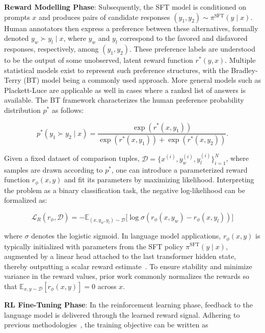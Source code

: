 \textbf{Reward Modelling Phase}: Subsequently, the SFT model is conditioned on prompts $x$ and produces pairs of candidate responses $(y_1, y_2)\sim \pi^\text{SFT}(y \mid x)$. Human annotators then express a preference between these alternatives, formally denoted $y_w\succ y_l \mid x$, where $y_w$ and $y_l$ correspond to the favored and disfavored responses, respectively, among $(y_1, y_2)$. These preference labels are understood to be the output of some unobserved, latent reward function $r^*(y, x)$. Multiple statistical models exist to represent such preference structures, with the Bradley-Terry (BT) \cite{bradley1952rankanalysis} model being a commonly used approach. More general models such as Plackett-Luce \citep{plackett1975analysis, luce2012individual} are applicable as well in cases where a ranked list of answers is available. The BT framework characterizes the human preference probability distribution $p^*$ as follows:

\begin{equation}\label{eq:bradley-terry}
    p^*(y_1\succ y_2 \mid x)=\frac{\exp\left(r^*(x, y_1)\right)}{\exp\left(r^*(x, y_1)\right) + \exp\left(r^*(x, y_2)\right)}.
\end{equation}

Given a fixed dataset of comparison tuples, $\mathcal{D} = \bigl\{x^{(i)}, y_w^{(i)}, y_l^{(i)}\bigr\}_{i=1}^N$, where samples are drawn according to $p^*$, one can introduce a parameterized reward function $r_{\phi}(x, y)$ and fit its parameters by maximizing likelihood. Interpreting the problem as a binary classification task, the negative log-likelihood can be formalized as:

\begin{equation}\label{eq:reward_model}
    \mathcal{L}_R(r_{\phi}, \mathcal{D}) = -\mathbb{E}_{(x, y_w, y_l)\sim \mathcal{D}}\bigl[\log \sigma(r_{\phi}(x, y_w)- r_{\phi}(x, y_l))\bigr]
\end{equation}

where $\sigma$ denotes the logistic sigmoid. In language model applications, $r_{\phi}(x, y)$ is typically initialized with parameters from the SFT policy $\pi^\text{SFT}(y \mid x)$, augmented by a linear head attached to the last transformer hidden state, thereby outputting a scalar reward estimate~\cite{ziegler2020finetuning}. To ensure stability and minimize variance in the reward values, prior work commonly normalizes the rewards so that $\mathbb{E}_{x,y\sim \mathcal{D}}\left[r_\phi(x, y)\right] = 0$ across $x$.

\textbf{RL Fine-Tuning Phase}: In the reinforcement learning phase, feedback to the language model is delivered through the learned reward signal. Adhering to previous methodologies~\citep{jaques2017sequence, jaques2020human}, the training objective can be written as

